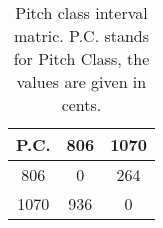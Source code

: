 \begin{table}
\begin{tabular}{c||  c  c  }	
P.C. & 806 & 1070 \\
\hline
\hline
806 & 0 & 264\\
1070 & 936 & 0     	
\end{tabular}
\label{tbl:pitch_class_interval_matrix}
\caption{Pitch class interval matric. P.C. stands for Pitch Class, the values are given in cents.}
\end{table}
